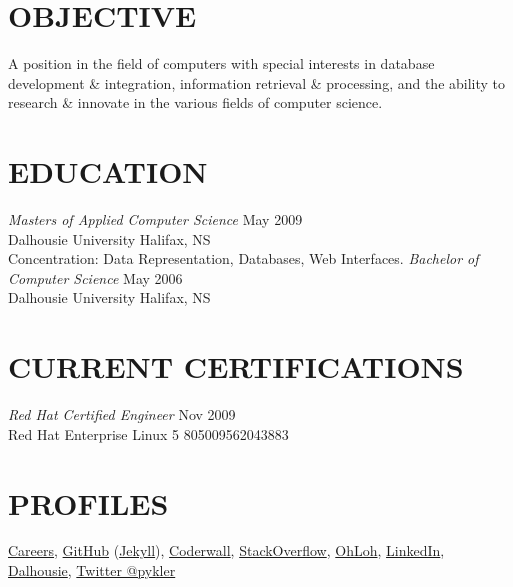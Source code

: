 \documentclass[line,margin]{res}
\begin{document}
\address{3139 Veith Street, Halifax, NS B3K 3G9}
\address{(902) 800-5288}


\begin{resume}

\section{OBJECTIVE}
    A position in the field of computers with special
    interests in database development {\&} integration,
    information retrieval {\&} processing, and the ability to
    research {\&} innovate in the various fields of computer
    science.


\section{EDUCATION}
    {\sl Masters of Applied Computer Science} \hfill May 2009\\
        Dalhousie University \hfill Halifax, NS\\
        Concentration: Data Representation, Databases,
        Web Interfaces.  \medskip
    \newline
    {\sl Bachelor of Computer Science} \hfill May 2006\\
        Dalhousie University \hfill Halifax, NS

\section{CURRENT CERTIFICATIONS}
    {\sl Red Hat Certified Engineer} \hfill Nov 2009\\
        Red Hat Enterprise Linux 5 \hfill 805009562043883\\

\section{PROFILES}
    \href{http://careers.stackoverflow.com/hatem}{Careers},
    \href{https://github.com/pykler/}{GitHub} (\href{http://pykler.github.io/}{Jekyll}),
    \href{https://coderwall.com/pykler}{Coderwall},
    \href{http://stackexchange.com/users/385316/pykler}{StackOverflow},
    \href{https://www.ohloh.net/accounts/pykler}{OhLoh},
    \href{http://ca.linkedin.com/in/pykler/}{LinkedIn},
    \\
    \href{http://web.cs.dal.ca/~nassrat/hatem-nassrat.html}{Dalhousie},
    \href{https://twitter.com/pykler}{Twitter @pykler}


\end{resume}
\end{document}
